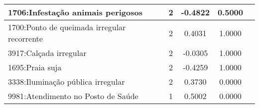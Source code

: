 \begin{table}[htbp]
\begin{tabular}{|l|c|c|c|c|}
		\hline
		1706:Infestação animais perigosos                     & 2                & -0.4822        & 0.5000           \\
		\hline
		1700:Ponto de queimada irregular recorrente           & 2                & 0.4031         & 1.0000           \\
		\hline
		3917:Calçada irregular                                & 2                & -0.0305        & 1.0000           \\
		\hline
		1695:Praia suja                                       & 2                & -0.4259        & 1.0000           \\
		\hline
		3338:Iluminação pública irregular                     & 2                & 0.3730         & 0.0000           \\
		\hline
		9981:Atendimento no Posto de Saúde                    & 1                & 0.5002         & 0.0000           \\
		\hline
	\end{tabular}
\end{table}


